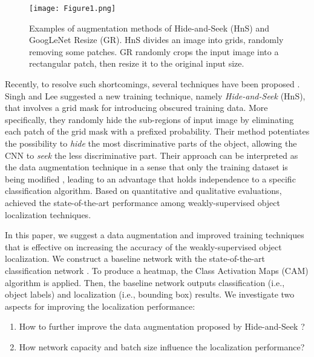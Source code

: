 \documentclass{bmvc2k}
\begin{document}
\begin{figure}[t]
\centering
\texttt{[image: Figure1.png]}
\caption{Examples of augmentation methods of Hide-and-Seek (HnS) and GoogLeNet Resize (GR). HnS divides an image into grids, randomly removing some patches. GR randomly crops the input image into a rectangular patch, then resize it to the original input size.}
\label{fig:augments}
\end{figure}

Recently, to resolve such shortcomings, several techniques have been proposed \cite{singh2017hide, kim2017two, zhang2018adversarial, li2018tell}. Singh and Lee \cite{singh2017hide} suggested a new training technique, namely \emph{Hide-and-Seek} (HnS), that involves a grid mask for introducing obscured training data. More specifically, they randomly hide the sub-regions of input image by eliminating each patch of the grid mask with a prefixed probability. Their method potentiates the possibility to \emph{hide} the most discriminative parts of the object, allowing the CNN to \emph{seek} the less discriminative part. Their approach can be interpreted as the data augmentation technique in a sense that only the training dataset is being modified \cite{li2018tell}, leading to an advantage that holds independence to a specific classification algorithm. Based on quantitative and qualitative evaluations, \cite{singh2017hide} achieved the state-of-the-art performance among weakly-supervised object localization techniques.

In this paper, we suggest a data augmentation and improved training techniques that is effective on increasing the accuracy of the weakly-supervised object localization. We construct a baseline network with the state-of-the-art classification network \cite{he2016identity}. To produce a heatmap, the Class Activation Maps (CAM) algorithm \cite{zhou2016learning} is applied. Then, the baseline network outputs classification (i.e., object labels) and localization (i.e., bounding box) results. We investigate two aspects for improving the localization performance: 

\begin{enumerate}
  \item How to further improve the data augmentation proposed by Hide-and-Seek \cite{singh2017hide}?
  \item How network capacity and batch size influence the localization performance?
\end{enumerate}
\end{document}
